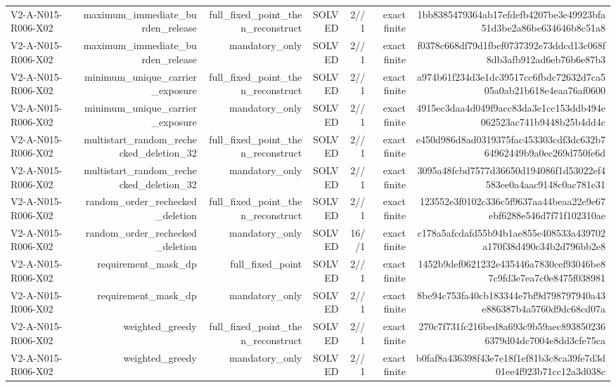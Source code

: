 {\begin{longtable}{lrrrrrr}
V2-A-N015-R006-X02 & maximum\_immediate\_burden\_release & full\_fixed\_point\_then\_reconstruct & SOLVED & 2//1 & exact finite & 1bb8385479364ab17efdefb4207be3e49923bfa51d3be2a86be634646b8c51a8 \\
V2-A-N015-R006-X02 & maximum\_immediate\_burden\_release & mandatory\_only & SOLVED & 2//1 & exact finite & f0378c668df79d1fbef0737392e73ddcd13c068f8db3afb912ad6eb76b6e87b3 \\
V2-A-N015-R006-X02 & minimum\_unique\_carrier\_exposure & full\_fixed\_point\_then\_reconstruct & SOLVED & 2//1 & exact finite & a974b61f234d3e1dc39517cc6fbdc72632d7ca505a0ab21b618e4eaa76af0600 \\
V2-A-N015-R006-X02 & minimum\_unique\_carrier\_exposure & mandatory\_only & SOLVED & 2//1 & exact finite & 4915ec3daa4d049f9acc83da3e1cc153ddb494e062523ac741b9448b25b4dd4c \\
V2-A-N015-R006-X02 & multistart\_random\_rechecked\_deletion\_32 & full\_fixed\_point\_then\_reconstruct & SOLVED & 2//1 & exact finite & e450d986d8ad0319375fac453303cdf3dc632b764962449b9a0ec269d750fe6d \\
V2-A-N015-R006-X02 & multistart\_random\_rechecked\_deletion\_32 & mandatory\_only & SOLVED & 2//1 & exact finite & 3095a48fcbd7577d36650d194086f1d53022ef4583ee0a4aac9148c0ac781e31 \\
V2-A-N015-R006-X02 & random\_order\_rechecked\_deletion & full\_fixed\_point\_then\_reconstruct & SOLVED & 2//1 & exact finite & 123552e3f0102c336c5f9637aa44beaa22e9e67ebf6288e546d7f71f102310ae \\
V2-A-N015-R006-X02 & random\_order\_rechecked\_deletion & mandatory\_only & SOLVED & 16//1 & exact finite & c178a5afcdafd55b94b1ae855e408533a439702a170f38d490c34b2d796bb2e8 \\
V2-A-N015-R006-X02 & requirement\_mask\_dp & full\_fixed\_point & SOLVED & 2//1 & exact finite & 1452b9def0621232e435446a7830cef93046be87c9fd3e7ea7c0e8475f038981 \\
V2-A-N015-R006-X02 & requirement\_mask\_dp & mandatory\_only & SOLVED & 2//1 & exact finite & 8be94c753fa40cb183344e7bf9d798797940a43e886387b4a5760d9dc68cd07a \\
V2-A-N015-R006-X02 & weighted\_greedy & full\_fixed\_point\_then\_reconstruct & SOLVED & 2//1 & exact finite & 270c7f731fc216bed8a693c9b59aec8938502366379d04dc7004e8dd3cfe75ca \\
V2-A-N015-R006-X02 & weighted\_greedy & mandatory\_only & SOLVED & 2//1 & exact finite & b0faf8a436398f43e7e18f1ef81b3c8ca39fe7d3d01ee4f923b71cc12a3d038c \\

\end{longtable}}
